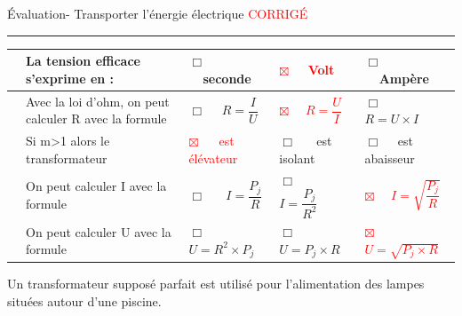 \documentclass[11pt,a4paper]{article}
\begin{document}
\noindent

\begin{center}
\LARGE{Évaluation- Transporter l'énergie électrique}
\Large{\textcolor{red}{CORRIGÉ}}\\[3mm]
\end{center}
\normalsize
\hrule 


\vspace {8 mm}




    \begin{tabular}{p{2mm} p{5.5cm}|C{3cm}|C{3cm}|C{3cm}}
    

         & La tension efficace s'exprime en :& $\Box $ ~~seconde & \textcolor{red}{$\boxtimes $ ~~Volt}  & $\Box $ ~~Ampère \\
         \hline
       & Avec la loi d'ohm, on peut calculer R avec la formule  & $\Box $ ~~$R=\dfrac{I}{U}$ & \textcolor{red}{$\boxtimes $ ~~$R=\dfrac{U}{I}$}   & $\Box $ ~~ $R = U \times I$ \\
        \hline
          & Si m>1 alors le transformateur  & \textcolor{red}{$\boxtimes $ ~~ est élévateur}  &$\Box $ ~~ est isolant  & $\Box $ ~~est abaisseur  \\
         \hline
          &On peut calculer I avec la formule  &$\Box $ ~~ $I=\dfrac{P_j}{R}$  &$\Box $ ~~ $I=\dfrac{P_j}{R^2}$  & \textcolor{red}{$\boxtimes $ ~~$I=\sqrt{\dfrac{P_j}{R}}$}  \\

         \hline
         
         & On peut calculer U avec la formule &$\Box $ ~~ $U=R^2 \times P_j$  &$\Box $ ~~ $U= P_j \times R$  & \textcolor{red}{$\boxtimes $ ~~ $U=\sqrt{P_j \times R}$}  \\

 
        
         \end{tabular}
\vspace{3mm}


Un transformateur supposé parfait est utilisé pour l'alimentation des lampes situées autour d'une piscine. 
\end{document}
